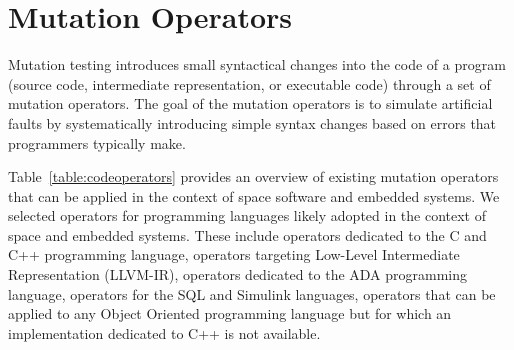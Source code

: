 
\section{Mutation Operators}
\label{sec:operators}

Mutation testing introduces small syntactical changes into the code of a program (source code, intermediate representation, or executable code) through a set of mutation operators.
The goal of the mutation operators is to simulate artificial faults by systematically introducing  simple syntax changes based on errors that programmers typically make.


Table~\ref{table:codeoperators} provides an overview of existing mutation operators that can be applied in the context of space software and embedded systems.
We selected operators for programming languages likely adopted in the context of space and embedded systems. These include operators dedicated to the C and C++ programming language, operators targeting Low-Level Intermediate Representation (LLVM-IR), operators dedicated to the ADA programming language, operators for the SQL and Simulink languages, operators that can be applied to any Object Oriented programming language but for which an implementation dedicated to C++ is not available.

